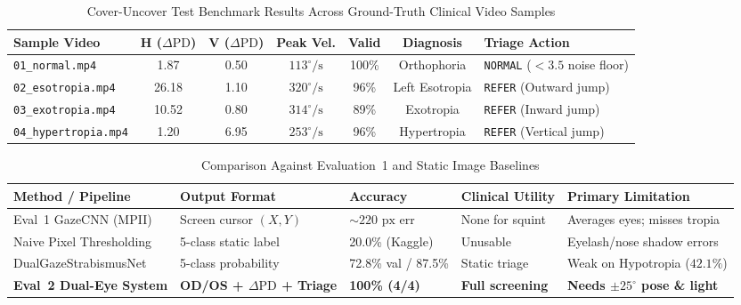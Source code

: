 \documentclass[11pt,a4paper]{article}
\begin{document}
\begin{table}[H]
\centering
\caption{Cover-Uncover Test Benchmark Results Across Ground-Truth Clinical Video Samples}
\label{tab:benchmark}
\footnotesize
\setlength{\tabcolsep}{3.5pt}
\begin{tabularx}{\textwidth}{@{}p{3.0cm}cccccX@{}}
\toprule
\textbf{Sample Video} & \textbf{H ($\Delta\text{PD}$)} & \textbf{V ($\Delta\text{PD}$)} & \textbf{Peak Vel.} & \textbf{Valid} & \textbf{Diagnosis} & \textbf{Triage Action} \\
\midrule
\texttt{01\_normal.mp4} & 1.87 & 0.50 & $113^\circ/\text{s}$ & 100\% & Orthophoria & \texttt{NORMAL} ($<3.5$ noise floor) \\
\texttt{02\_esotropia.mp4} & 26.18 & 1.10 & $320^\circ/\text{s}$ & 96\% & Left Esotropia & \texttt{REFER} (Outward jump) \\
\texttt{03\_exotropia.mp4} & 10.52 & 0.80 & $314^\circ/\text{s}$ & 89\% & Exotropia & \texttt{REFER} (Inward jump) \\
\texttt{04\_hypertropia.mp4} & 1.20 & 6.95 & $253^\circ/\text{s}$ & 96\% & Hypertropia & \texttt{REFER} (Vertical jump) \\
\bottomrule
\end{tabularx}
\end{table}

\begin{table}[H]
\centering
\caption{Comparison Against Evaluation~1 and Static Image Baselines}
\label{tab:baseline}
\footnotesize
\setlength{\tabcolsep}{4pt}
\begin{tabularx}{\textwidth}{@{}p{3.6cm}p{2.9cm}p{2.5cm}p{2.5cm}X@{}}
\toprule
\textbf{Method / Pipeline} & \textbf{Output Format} & \textbf{Accuracy} & \textbf{Clinical Utility} & \textbf{Primary Limitation} \\
\midrule
Eval~1 GazeCNN (MPII) & Screen cursor $(X,Y)$ & $\sim 220\text{ px}$ err & None for squint & Averages eyes; misses tropia \\
Naive Pixel Thresholding & 5-class static label & 20.0\% (Kaggle) & Unusable & Eyelash/nose shadow errors \\
DualGazeStrabismusNet & 5-class probability & 72.8\% val / 87.5\% & Static triage & Weak on Hypotropia ($42.1\%$) \\
\textbf{Eval~2 Dual-Eye System} & \textbf{OD/OS + $\Delta\text{PD}$ + Triage} & \textbf{100\% (4/4)} & \textbf{Full screening} & \textbf{Needs $\pm 25^\circ$ pose \& light} \\
\bottomrule
\end{tabularx}
\end{table}
\end{document}
